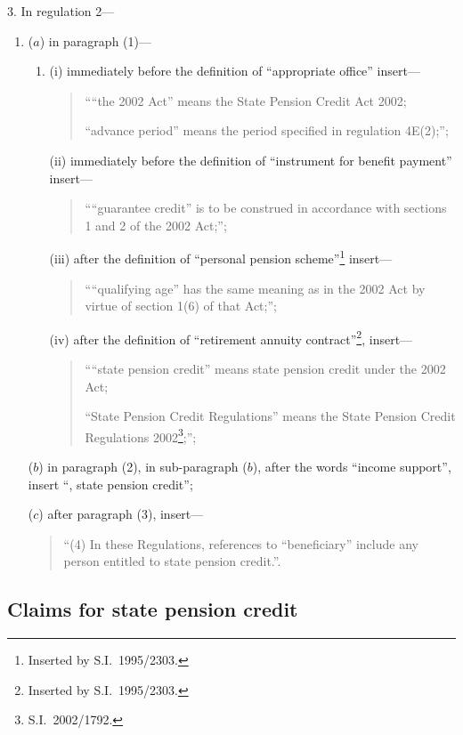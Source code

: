 \documentclass[12pt,a4paper]{article}
\begin{document}
3.  In regulation 2—
\begin{enumerate}\item[]
($a$) in paragraph (1)—
\begin{enumerate}\item[]
(i) immediately before the definition of “appropriate office” insert—
\begin{quotation}
““the 2002 Act” means the State Pension Credit Act 2002;

“advance period” means the period specified in regulation 4E(2);”;
\end{quotation}

(ii) immediately before the definition of “instrument for benefit payment” insert—
\begin{quotation}
    ““guarantee credit” is to be construed in accordance with sections 1 and 2 of the 2002 Act;”; 
\end{quotation}

(iii) after the definition of “personal pension scheme”\footnote{Inserted by S.I.\ 1995/2303.} insert—
\begin{quotation}
    ““qualifying age” has the same meaning as in the 2002 Act by virtue of section 1(6) of that Act;”; 
\end{quotation}

(iv) after the definition of “retirement annuity contract”\footnote{Inserted by S.I.\ 1995/2303.}, insert—
\begin{quotation}
““state pension credit” means state pension credit under the 2002 Act;

“State Pension Credit Regulations” means the State Pension Credit Regulations 2002\footnote{S.I.\ 2002/1792.};”;
\end{quotation}
\end{enumerate}

($b$) in paragraph (2), in sub-paragraph ($b$), after the words “income support”, insert “, state pension credit”;

($c$) after paragraph (3), insert—
\begin{quotation}
“(4) In these Regulations, references to “beneficiary” include any person entitled to state pension credit.”.
\end{quotation}
\end{enumerate}

\subsection[4. Claims for state pension credit]{Claims for state pension credit}
\end{document}
